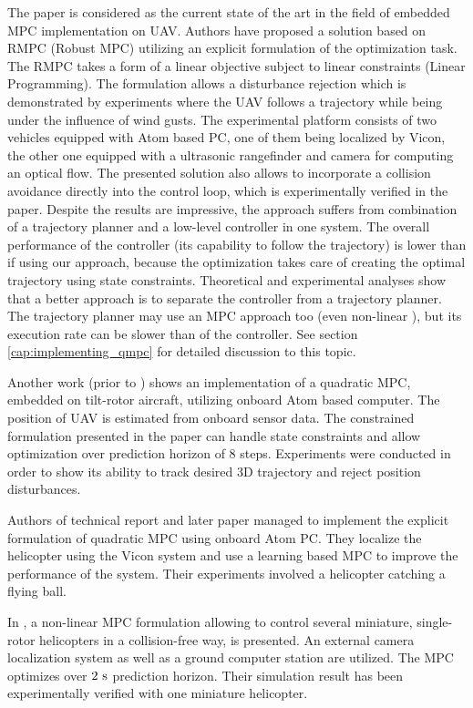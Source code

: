The paper \citep{alexis2014rmpc} is considered as the current state of the art in the field of embedded MPC implementation on UAV. Authors have proposed a solution based on RMPC (Robust MPC)  utilizing an explicit formulation of the optimization task. The RMPC takes a form of a linear objective subject to linear constraints (Linear Programming). The formulation allows a disturbance rejection which is demonstrated by experiments where the UAV follows a trajectory while being under the influence of wind gusts. The experimental platform consists of two vehicles equipped with Atom based PC, one of them being localized by Vicon, the other one equipped with a ultrasonic rangefinder and camera for computing an optical flow. The presented solution also allows to incorporate a collision avoidance directly into the control loop, which is experimentally verified in the paper. Despite the results are impressive, the approach suffers from combination of a trajectory planner and a low-level controller in one system. The overall performance of the controller (its capability to follow the trajectory) is lower than if using our approach, because the optimization takes care of creating the optimal trajectory using state constraints. Theoretical and experimental analyses show that a better approach is to separate the controller from a trajectory planner. The trajectory planner may use an MPC approach too (even non-linear \citep{saska2014formations}), but its execution rate can be slower than of the controller. See section \ref{cap:implementing_qmpc} for detailed discussion to this topic.

Another work \citep{papachristos2013} (prior to \citep{alexis2014rmpc}) shows an implementation of a quadratic MPC, embedded on tilt-rotor aircraft, utilizing onboard Atom based computer. The position of UAV is estimated from onboard sensor data. The constrained formulation presented in the paper can handle state constraints and allow optimization over prediction horizon of 8 steps. Experiments were conducted in order to show its ability to track desired 3D trajectory and reject position disturbances.

Authors of technical report \citep{bouffard2012dtic} and later paper \citep{bouffard2012learning} managed to implement the explicit formulation of quadratic MPC using onboard Atom PC. They localize the helicopter using the Vicon system and use a learning based MPC to improve the performance of the system. Their experiments involved a helicopter catching a flying ball. 

In \cite{suzuki2014collision}, a non-linear MPC formulation allowing to control several miniature, single-rotor helicopters in a collision-free way, is presented. An external camera localization system as well as a ground computer station are utilized. The MPC optimizes over $2 ~\mathrm{s}$ prediction horizon. Their simulation result has been experimentally verified with one miniature helicopter.

